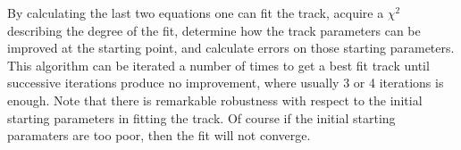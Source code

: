     By calculating the last two equations one can fit the track, acquire a $\chi^{2}$ describing the degree of the fit, determine how the track parameters can be improved at the starting point, and calculate errors on those starting parameters. This algorithm can be iterated a number of times to get a best fit track until successive iterations produce no improvement, where usually 3 or 4 iterations is enough. Note that there is remarkable robustness with respect to the initial starting parameters in fitting the track. Of course if the initial starting paramaters are too poor, then the fit will not converge.
